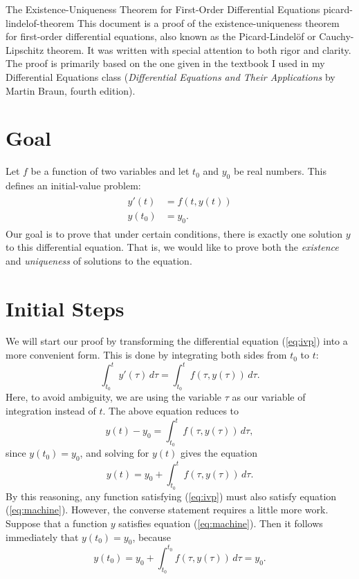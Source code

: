 \documentclass{myart}
\newcommand{\eq}[1]{(\ref{eq:#1})}
\begin{document}
\titlepage
{The Existence-Uniqueness Theorem for First-Order Differential
  Equations}
{picard-lindelof-theorem}
{This document is a proof of the existence-uniqueness theorem for
  first-order differential equations, also known as the
  Picard-Lindel\"of or Cauchy-Lipschitz theorem. It was written with
  special attention to both rigor and clarity. The proof is primarily
  based on the one given in the textbook I used in my Differential
  Equations class (\textit{Differential Equations and Their
    Applications} by Martin Braun, fourth edition).}

\section{Goal}

Let $f$ be a function of two variables and let $t_0$ and $y_0$ be real
numbers. This defines an initial-value problem:
\begin{align} \label{eq:ivp}
\begin{split}
y'(t) &= f(t, y(t)) \\
y(t_0) &= y_0.
\end{split}
\end{align}
Our goal is to prove that under certain conditions, there is exactly
one solution $y$ to this differential equation. That is, we would like
to prove both the \emph{existence} and \emph{uniqueness} of solutions
to the equation.

\section{Initial Steps}

We will start our proof by transforming the differential equation
\eq{ivp} into a more convenient form. This is done by integrating both
sides from $t_0$ to $t$:
\begin{equation*}
\int_{t_0}^t y'(\tau) \,d\tau = \int_{t_0}^t f(\tau, y(\tau)) \,d\tau.
\end{equation*}
Here, to avoid ambiguity, we are using the variable $\tau$ as our
variable of integration instead of $t$. The above equation reduces to
\begin{equation*}
y(t) - y_0 = \int_{t_0}^t f(\tau, y(\tau)) \,d\tau,
\end{equation*}
since $y(t_0) = y_0$, and solving for $y(t)$ gives the equation
\begin{equation} \label{eq:machine}
y(t) = y_0 + \int_{t_0}^t f(\tau, y(\tau)) \,d\tau.
\end{equation}
By this reasoning, any function satisfying \eq{ivp} must also satisfy
equation \eq{machine}. However, the converse statement requires a
little more work. Suppose that a function $y$ satisfies equation
\eq{machine}. Then it follows immediately that $y(t_0) = y_0$, because
\begin{equation*}
y(t_0) = y_0 + \int_{t_0}^{t_0} f(\tau, y(\tau)) \,d\tau = y_0.
\end{equation*}
\end{document}
